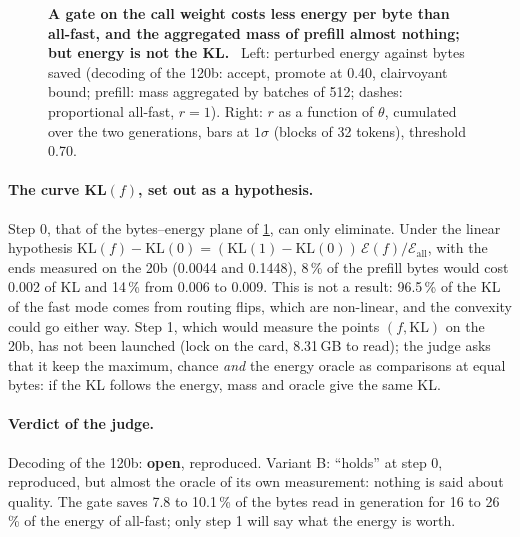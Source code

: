 \begin{figure}[tbp]
\centering
{}\hfill
{}
\caption[P6: the bytes--energy plane and $r$ as a function of $\theta$]{\textbf{A gate on the call weight costs less energy per byte than all-fast, and the aggregated mass of prefill almost nothing; but energy is not the KL.} \mes~Left: perturbed energy against bytes saved (decoding of the 120b: accept, promote at 0.40, clairvoyant bound; prefill: mass aggregated by batches of 512; dashes: proportional all-fast, $r = 1$). Right: $r$ as a function of $\theta$, cumulated over the two generations, bars at $1\sigma$ (blocks of 32 tokens), threshold 0.70. \HorsStyle{}}
\label{fig:t3-mim-p6}
\end{figure}

\paragraph{The curve KL$(f)$, set out as a hypothesis.} Step 0, that of the bytes--energy plane of \cref{fig:t3-mim-p6}, can only eliminate. Under the linear hypothesis $\mathrm{KL}(f) - \mathrm{KL}(0) = (\mathrm{KL}(1) - \mathrm{KL}(0))\,\mathcal E(f)/\mathcal E_{\text{all}}$, with the ends measured on the 20b (0.0044 and 0.1448), 8\,\% of the prefill bytes would cost 0.002 of KL and 14\,\% from 0.006 to 0.009. This is not a result: 96.5\,\% of the KL of the fast mode comes from routing flips, which are non-linear, and the convexity could go either way. Step 1, which would measure the points $(f, \mathrm{KL})$ on the 20b, has not been launched (lock on the card, 8.31\,GB to read); the judge asks that it keep the maximum, chance \emph{and} the energy oracle as comparisons at equal bytes: if the KL follows the energy, mass and oracle give the same KL.

\paragraph{Verdict of the judge.} Decoding of the 120b: \textbf{open}, reproduced. Variant B: ``holds'' at step 0, reproduced, but almost the oracle of its own measurement: nothing is said about quality. The gate saves 7.8 to 10.1\,\% of the bytes read in generation for 16 to 26\,\% of the energy of all-fast; only step 1 will say what the energy is worth.

